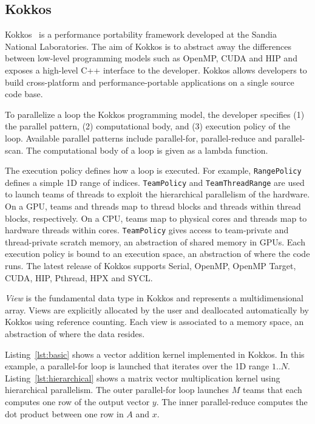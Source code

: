 \documentclass[sigconf]{acmart}
\begin{document}
\subsection{Kokkos}

Kokkos~\cite{Edwards2014} is a performance portability framework developed at
the Sandia National Laboratories. The aim of Kokkos is to abstract away the
differences between low-level programming models such as OpenMP, CUDA and HIP
and exposes a high-level C++ interface to the developer. Kokkos allows
developers to build cross-platform and performance-portable applications on a
single source code base.

To parallelize a loop the Kokkos programming model, the developer specifies (1)
the parallel pattern, (2) computational body, and (3) execution policy of the
loop. Available parallel patterns include parallel-for, parallel-reduce and
parallel-scan. The computational body of a loop is given as a lambda function.

The execution policy defines how a loop is executed. For example,
\texttt{RangePolicy} defines a simple 1D range of indices. \texttt{TeamPolicy}
and \texttt{TeamThreadRange} are used to launch teams of threads to exploit
the hierarchical parallelism of the hardware. On a GPU, teams and threads map
to thread blocks and threads within thread blocks, respectively. On a CPU,
teams map to physical cores and threads map to hardware threads within cores.
\texttt{TeamPolicy} gives access to team-private and thread-private scratch
memory, an abstraction of shared memory in GPUs. Each execution policy is
bound to an execution space, an abstraction of where the code runs. The latest
release of Kokkos supports Serial, OpenMP, OpenMP Target, CUDA, HIP, Pthread,
HPX and SYCL\@.

\textit{View} is the fundamental data type in Kokkos and represents a
multidimensional array. Views are explicitly allocated by the user and
deallocated automatically by Kokkos using reference counting. Each view is
associated to a memory space, an abstraction of where the data resides.

Listing~\ref{lst:basic} shows a vector addition  kernel implemented in Kokkos.
In this example, a parallel-for loop is launched that iterates over the 1D
range $1..N$.
Listing~\ref{lst:hierarchical} shows a matrix vector multiplication kernel
using hierarchical parallelism. The outer parallel-for loop launches $M$ teams
that each computes one row of the output vector $y$. The inner parallel-reduce
computes the dot product between one row in $A$ and $x$.
\end{document}
